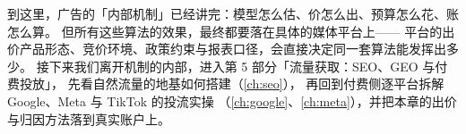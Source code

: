 到这里，广告的「内部机制」已经讲完：模型怎么估、价怎么出、预算怎么花、账怎么算。
但所有这些算法的效果，最终都要落在具体的媒体平台上——
平台的出价产品形态、竞价环境、政策约束与报表口径，会直接决定同一套算法能发挥出多少。
接下来我们离开机制的内部，进入第 5 部分「流量获取：SEO、GEO 与付费投放」，
先看自然流量的地基如何搭建（\cref{ch:seo}），
再回到付费侧逐平台拆解 Google、Meta 与 TikTok 的投流实操
（\cref{ch:google}、\cref{ch:meta}），并把本章的出价与归因方法落到真实账户上。
